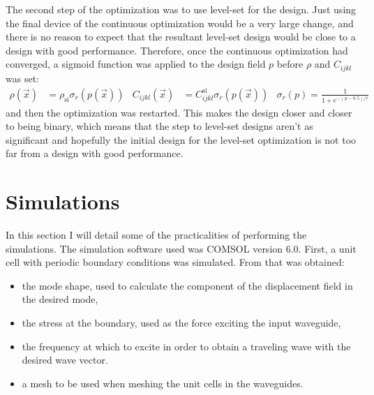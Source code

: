 The second step of the optimization was to use level-set for the design.
Just using the final device of the continuous optimization would be a very large
change, and there is no reason to expect that the resultant level-set design
would be close to a design with good performance.
Therefore, once the continuous optimization had converged, a sigmoid function
was applied to the design field $p$ before $\rho$ and $C_{ijkl}$ was set:
\begin{align}
	\rho(\vec x) &= \rho_\text{si} \sigma_r(p(\vec x))
	&
	C_{ijkl}(\vec x) &= C_{ijkl}^\text{si} \sigma_r(p(\vec x))
	&
	\sigma_r(p) = \frac{1}{1+e^{-(p-0.5)/r}}
\end{align}
and then the optimization was restarted.
This makes the design closer and closer to being binary, which means that the
step to level-set designs aren't as significant and hopefully the initial design
for the level-set optimization is not too far from a design with good performance.
\section{Simulations}

In this section I will detail some of the practicalities of performing the
simulations.
The simulation software used was COMSOL version 6.0.
First, a unit cell with periodic boundary conditions was simulated.
From that was obtained:
\begin{itemize}
	\item the mode shape, used to calculate the component of the displacement
		field in the desired mode,
	\item the stress at the boundary, used as the force exciting the input
		waveguide,
	\item the frequency at which to excite in order to obtain a traveling wave
		with the desired wave vector.
	\item a mesh to be used when meshing the unit cells in the waveguides.
\end{itemize}

